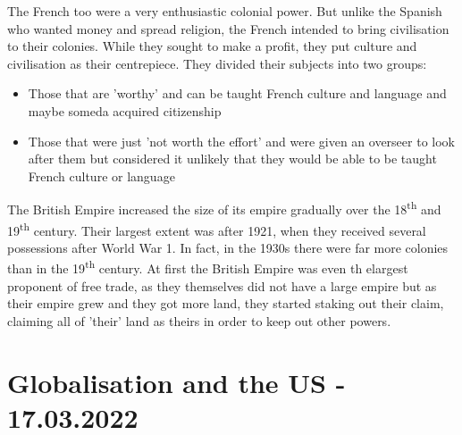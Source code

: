 \documentclass{article}
\begin{document}
	The French too were a very enthusiastic colonial power. But unlike the Spanish who wanted money and spread religion, the French intended to bring civilisation to their colonies. While they sought to make a profit, they put culture and civilisation as their centrepiece. They divided their subjects into two groups:
	\begin{itemize}
		\item{Those that are 'worthy' and can be taught French culture and language and maybe someda acquired citizenship}
		\item{Those that were just 'not worth the effort' and were given an overseer to look after them but considered it unlikely that they would be able to be taught French culture or language}
	\end{itemize}
	The British Empire increased the size of its empire gradually over the 18\textsuperscript{th} and 19\textsuperscript{th} century. Their largest extent was after 1921, when they received several possessions after World War 1. In fact, in the 1930s there were far more colonies than in the 19\textsuperscript{th} century. At first the British Empire was even th elargest proponent of free trade, as they themselves did not have a large empire but as their empire grew and they got more land, they started staking out their claim, claiming all of 'their' land as theirs in order to keep out other powers. \\

	\section{Globalisation and the US - 17.03.2022}
\end{document}
